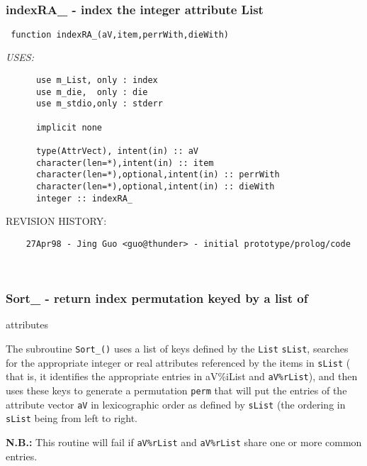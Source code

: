  
\mbox{}\hrulefill\ 
 

 \subsubsection{indexRA\_ - index the integer attribute List}


 
  
 
\begin{verbatim} 
 function indexRA_(aV,item,perrWith,dieWith)\end{verbatim}{\em USES:}
\begin{verbatim}      use m_List, only : index
      use m_die,  only : die
      use m_stdio,only : stderr
 
      implicit none
 
      type(AttrVect), intent(in) :: aV
      character(len=*),intent(in) :: item
      character(len=*),optional,intent(in) :: perrWith
      character(len=*),optional,intent(in) :: dieWith
      integer :: indexRA_
 \end{verbatim}{\sf REVISION HISTORY:}
\begin{verbatim}  	27Apr98 - Jing Guo <guo@thunder> - initial prototype/prolog/code\end{verbatim}
 
 
\mbox{}\hrulefill\ 
 

 \subsubsection{Sort\_ - return index permutation keyed by a list of}


             attributes
 
  The subroutine {\tt Sort\_()} uses a list of keys defined by the {\tt List} 
  {\tt sList}, searches for the appropriate integer or real attributes
  referenced by the items in {\tt sList} ( that is, it identifies the 
  appropriate entries in {aV\%iList} and {\tt aV\%rList}), and then 
  uses these keys to generate a permutation {\tt perm} that will put
  the entries of the attribute vector {\tt aV} in lexicographic order
  as defined by {\tt sList} (the ordering in {\tt sList} being from
  left to right.
 
  {\bf N.B.:}  This routine will fail if {\tt aV\%rList} and 
  {\tt aV\%rList} share one or more common entries. 
 
